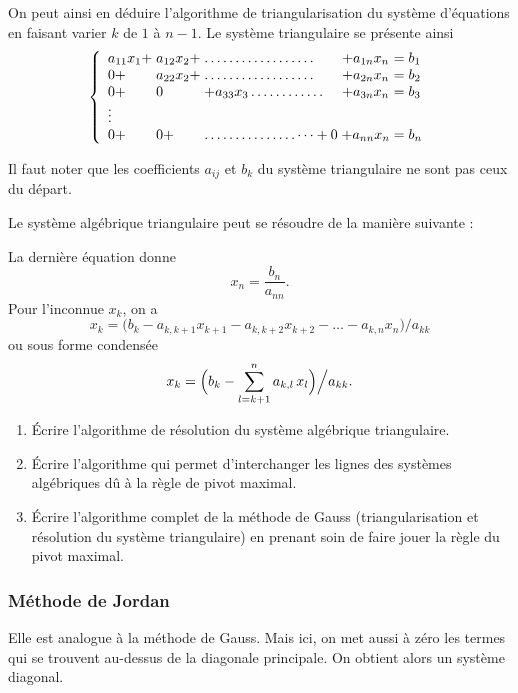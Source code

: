 On peut ainsi en déduire l'algorithme de triangularisation du système
d'équations en faisant varier $k$ de $1$ à $n-1$. Le système triangulaire se
présente ainsi
\[
  \left\{
  \begin{array}{l@{\;}l@{\;}l@{\;}c@{\;}l}
    a_{11}x_1 + & a_{12}x_2 + & \dots\dots\dots\dots\dots\dots & + a_{1n}x_n &= b_1\\
    0 + & a_{22}x_2 + & \dots\dots\dots\dots\dots\dots & + a_{2n}x_n &= b_2\\
    0 + & 0 & + a_{33}x_3 \dots\dots\dots\dots & + a_{3n}x_n &= b_3\\
    \vdots & & & & \\
    0 + & 0 + & \dots\dots\dots\dots\dots\dots + 0 & + a_{nn}x_n &= b_n
  \end{array}
  \right.
\]

\NB Il faut noter que les coefficients $a_{ij}$ et $b_k$ du système
triangulaire ne sont pas ceux du départ.

Le système algébrique triangulaire peut se résoudre de la manière suivante :

La dernière équation donne
\[
  x_n = \frac{b_n}{a_{nn}} .
\]
Pour l'inconnue $x_k$, on a
\[
  x_k = \bigl(b_k - a_{k,k+1}x_{k+1} - a_{k,k+2}x_{k+2} - \dots - a_{k,n}x_n\bigr)\big/ a_{kk}
\]
ou sous forme condensée
\[
  x_k = \Bigl(b_k - \sum_{l=k+1}^{n} a_{k,l}\,x_l\Bigr)\Big/ a_{kk} .
\]

\begin{exercice}[Exercices]
\begin{enumerate}
  \item Écrire l'algorithme de résolution du système algébrique triangulaire.
  \item Écrire l'algorithme qui permet d'interchanger les lignes des systèmes
        algébriques dû à la règle de pivot maximal.
  \item Écrire l'algorithme complet de la méthode de Gauss (triangularisation
        et résolution du système triangulaire) en prenant soin de faire jouer
        la règle du pivot maximal.
\end{enumerate}
\end{exercice}

\subsubsection{Méthode de Jordan}

Elle est analogue à la méthode de Gauss. Mais ici, on met aussi à zéro les
termes qui se trouvent au-dessus de la diagonale principale. On obtient alors
un système diagonal.

